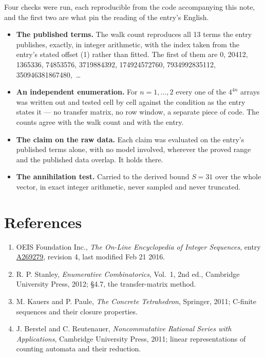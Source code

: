 \documentclass[11pt]{article}
\theoremstyle{definition}
\begin{document}
Four checks were run, each reproducible from the code accompanying this note, and the first two are what pin the reading of the entry's English.

\begin{itemize}

\item {\bfseries The published terms.} The walk count reproduces all 13 terms the entry publishes, exactly, in integer arithmetic, with the index taken from the entry's stated offset (1) rather than fitted. The first of them are 0, 20412, 1365336, 74853576, 3719884392, 174924572760, 7934992835112, 350946381867480,~\dots

\item {\bfseries An independent enumeration.} For $n = 1,\dots,2$ every one of the $4^{4n}$ arrays was written out and tested cell by cell against the condition as the entry states it --- no transfer matrix, no row window, a separate piece of code. The counts agree with the walk count and with the entry.

\item {\bfseries The claim on the raw data.} Each claim was evaluated on the entry's published terms alone, with no model involved, wherever the proved range and the published data overlap. It holds there.

\item {\bfseries The annihilation test.} Carried to the derived bound $S = 31$ over the whole vector, in exact integer arithmetic, never sampled and never truncated.

\end{itemize}

\section{References}

\begin{enumerate}

\item OEIS Foundation Inc., \emph{The On-Line Encyclopedia of Integer Sequences}, entry \href{https://oeis.org/A269279}{A269279}, revision 4, last modified Feb 21 2016.

\item R. P. Stanley, \emph{Enumerative Combinatorics}, Vol.~1, 2nd ed., Cambridge University Press, 2012; \S4.7, the transfer-matrix method.

\item M. Kauers and P. Paule, \emph{The Concrete Tetrahedron}, Springer, 2011; C-finite sequences and their closure properties.

\item J. Berstel and C. Reutenauer, \emph{Noncommutative Rational Series with Applications}, Cambridge University Press, 2011; linear representations of counting automata and their reduction.

\end{enumerate}
\end{document}

